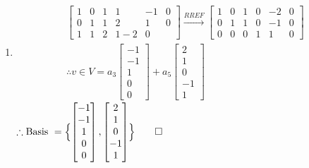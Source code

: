 \documentclass[12pt, a4paper]{article}
\begin{document}
\begin{enumerate}[Q\arabic*.]
\begin{enumerate}[(\alph*)]
      \item 
        \begin{align*}
          \begin{bmatrix}
            1 & 0 & 1 & 1 & -1 & 0\\
            0 & 1 & 1 & 2 & 1 & 0\\
            1 & 1 & 2 & 1 - 2 & 0
          \end{bmatrix} \xrightarrow{RREF}
          \begin{bmatrix}
            1 & 0 & 1 & 0 & -2 & 0\\
            0 & 1 & 1 & 0 & -1 & 0\\
            0 & 0 & 0 & 1 & 1 & 0
          \end{bmatrix}\\
          \therefore v \in V = a_3\begin{bmatrix}-1\\-1\\1\\0\\0\end{bmatrix} + a_5\begin{bmatrix}2\\1\\0\\-1\\1\end{bmatrix}
        \end{align*}
        $\therefore \text{Basis } =\Bigl\{\begin{bmatrix}-1\\-1\\1\\0\\0\end{bmatrix},\begin{bmatrix}2\\1\\0\\-1\\1\end{bmatrix}\Bigr\}\qed$
    \end{enumerate}


\end{enumerate}
\end{document}
